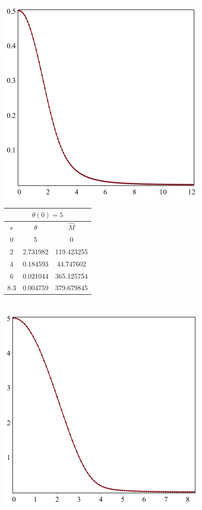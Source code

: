 \documentclass[11pt]{article} %
\begin{document}
\includegraphics[scale=.5]{plots/wd2.png}\\
\begin{tabular}{ | c c c |}
\multicolumn{3}{c}{ $\theta(0) = 5$ } \\
\hline
s & $\theta$ & $\hat M$\\
\hline
0 & 5 & 0\\
2 &2.731982 &119.423255 \\
4 & 0.184593& 44.747602\\
6 & 0.021044& 365.125754\\
8.3 &0.004759 &379.679845\\
\hline
\end{tabular}\\
\includegraphics[scale=.5]{plots/wd3.png}\\
\end{document}

